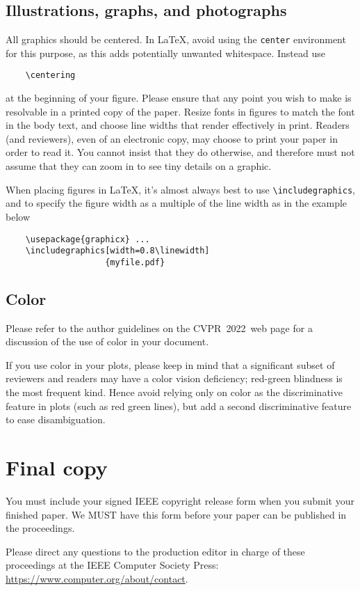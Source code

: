 \documentclass[10pt,twocolumn,letterpaper]{article}
\def\confName{CVPR}
\def\confYear{2022}
\begin{document}
  \subsection{Illustrations, graphs, and photographs}

  All graphics should be centered.
  In \LaTeX, avoid using the \texttt{center} environment for this purpose, as this adds potentially unwanted whitespace.
  Instead use
  {\small\begin{verbatim}
    \centering
  \end{verbatim}}
  at the beginning of your figure.
  Please ensure that any point you wish to make is resolvable in a printed copy of the paper.
  Resize fonts in figures to match the font in the body text, and choose line widths that render effectively in print.
  Readers (and reviewers), even of an electronic copy, may choose to print your paper in order to read it.
  You cannot insist that they do otherwise, and therefore must not assume that they can zoom in to see tiny details on a graphic.

  When placing figures in \LaTeX, it's almost always best to use \verb+\includegraphics+, and to specify the figure width as a multiple of the line width as in the example below
  {\small\begin{verbatim}
    \usepackage{graphicx} ...
    \includegraphics[width=0.8\linewidth]
                    {myfile.pdf}
  \end{verbatim}
  }


  \subsection{Color}

  Please refer to the author guidelines on the \confName\ \confYear\ web page for a discussion of the use of color in your document.

  If you use color in your plots, please keep in mind that a significant subset of reviewers and readers may have a color vision deficiency; red-green blindness is the most frequent kind.
  Hence avoid relying only on color as the discriminative feature in plots (such as red \vs green lines), but add a second discriminative feature to ease disambiguation.

  \section{Final copy}

  You must include your signed IEEE copyright release form when you submit your finished paper.
  We MUST have this form before your paper can be published in the proceedings.

  Please direct any questions to the production editor in charge of these proceedings at the IEEE Computer Society Press:
  \url{https://www.computer.org/about/contact}.


  {\small
  
  
  }

  
\end{document}
